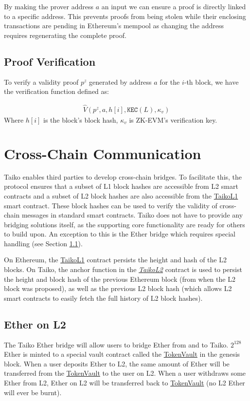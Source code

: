 \documentclass[9pt,oneside]{amsart}
\begin{document}
\begin{multicols}{2}
By making the prover address $a$ an input we can ensure a proof is directly linked to a specific address. This prevents proofs from being stolen while their enclosing transactions are pending in Ethereum's mempool as changing the address requires regenerating the complete proof.

\subsection{Proof Verification} To verify a validity proof $p^z$ generated by address $a$ for the $i$-th block, we have the verification function defined as:

\begin{eqnarray}
    \hat{V}(p^z, a, h[i], \texttt{KEC}(L), \kappa_v)
\end{eqnarray}
Where $h[i]$ is the block's block hash, $\kappa_v$ is ZK-EVM's verification key.

\section{Cross-Chain Communication}\label{sec:bridges}
Taiko enables third parties to develop cross-chain bridges. To facilitate this, the protocol ensures that a subset of L1 block hashes are accessible from L2 smart contracts and a subset of  L2 block hashes are also accessible from the \underline{TaikoL1} smart contract. These block hashes can be used to verify the validity of cross-chain messages in standard smart contracts. Taiko does not have to provide any bridging solutions itself, as the supporting core functionality are ready for others to build upon. An exception to this is the Ether bridge which requires special handling (see Section \ref{eth-bridge}). 

On Ethereum, the \underline{TaikoL1} contract persists the height and hash of the L2 blocks. On Taiko, the anchor function in the \emph{\underline{TaikoL2}} contract is used to persist the height and block hash of the previous Ethereum block (from when the L2 block was proposed), as well as the previous L2 block hash (which allows L2 smart contracts to easily fetch the full history of L2 block hashes).

\subsection{Ether on L2}
\label{eth-bridge}
The Taiko Ether bridge will allow users to bridge Ether from and to Taiko. $2^{128}$ Ether is minted to a special vault contract called the \underline{TokenVault} in the genesis block. When a user deposits Ether to L2, the same amount of Ether will be transferred from the \underline{TokenVault} to the user on L2. When a user withdraws some Ether from L2, Ether on L2 will be transferred back to \underline{TokenVault} (no L2 Ether will ever be burnt).


\end{multicols}
\end{document}
